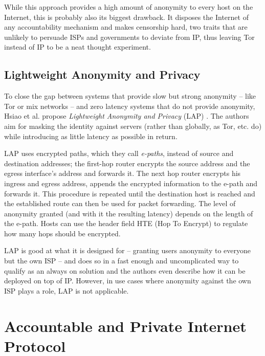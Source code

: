 \documentclass{acm_proc_article-sp}
\begin{document}
While this approach provides a high amount of anonymity to every host on the Internet, this is probably also its biggest drawback. It disposes the Internet of any accountability mechanism and makes censorship hard, two traits that are unlikely to persuade ISPs and governments to deviate from IP, thus leaving Tor instead of IP to be a neat thought experiment.
\subsection{Lightweight Anonymity and Privacy}
To close the gap between systems that provide slow but strong anonymity -- like Tor or mix networks -- and zero latency systems that do not provide anonymity, Hsiao et al. propose \emph{Lightweight Anonymity and Privacy} (LAP) \cite{lap}. The authors aim for masking the identity against servers (rather than globally, as Tor, etc. do) while introducing as little latency as possible in return. 

LAP uses encrypted paths, which they call \emph{e-paths}, instead of source and destination addresses; the first-hop router encrypts the source address and the egress interface's address and forwards it. The next hop router encrypts his ingress and egress address, appends the encrypted information to the e-path and forwards it. This procedure is repeated until the destination host is reached and the established route can then be used for packet forwarding. The level of anonymity granted (and with it the resulting latency) depends on the length of the e-path. Hosts can use the header field HTE (Hop To Encrypt) to regulate how many hops should be encrypted.

LAP is good at what it is designed for -- granting users anonymity to everyone but the own ISP -- and does so in a fast enough and uncomplicated way to qualify as an always on solution and the authors even describe how it can be deployed on top of IP. However, in use cases where anonymity against the own ISP plays a role, LAP is not applicable.



\section{Accountable and Private Internet Protocol}
\label{sec:apip}
\end{document}
